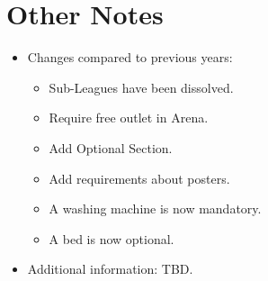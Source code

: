 \pagebreak
\section{Other Notes}
\begin{itemize}
    \item Changes compared to previous years:
    \begin{itemize}
        \item Sub-Leagues have been dissolved.
        \item Require free outlet in Arena.
        \item Add Optional Section.
        \item Add requirements about posters.
        \item A washing machine is now mandatory.
        \item A bed is now optional.
    \end{itemize}
    \item Additional information: TBD.
\end{itemize}
